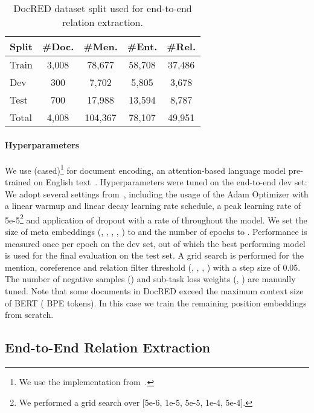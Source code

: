 \documentclass[11pt,a4paper]{article}
\begin{document}
\begin{table}
\centering
\begin{tabular}{l c c c c }
\toprule
    \textbf{Split} & {\#Doc.} & {\#Men.} & {\#Ent.} & {\#Rel.} \\ \midrule
     Train & 3,008 & 78,677 & 58,708 & 37,486 \\
     Dev & 300 & 7,702 & 5,805 & 3,678 \\
     Test & 700 & 17,988 & 13,594 & 8,787 \\
     Total & 4,008 & 104,367 & 78,107 & 49,951 \\
     \bottomrule
\end{tabular}
\caption{DocRED dataset split used for end-to-end relation extraction.} 
\label{table:joint_split} 
\end{table}

\paragraph{Hyperparameters} We use  (cased)\footnote{We use the implementation from~\cite{wolf:2019:hugging_face}.} for document encoding, an attention-based language model pre-trained on English text~\cite{devlin:2018:bert}. Hyperparameters were tuned on the end-to-end dev set: We adopt several settings from~\cite{devlin:2018:bert}, including the usage of the Adam Optimizer with a linear warmup and linear decay learning rate schedule, a peak learning rate of 5e-5\footnote{We performed a grid search over [5e-6, 1e-5, 5e-5, 1e-4, 5e-4].} and application of dropout with a rate of  throughout the model. We set the size of meta embeddings (, , , , ) to  and the number of epochs to . Performance is measured once per epoch on the dev set, out of which the best performing model is used for the final evaluation on the test set. A grid search is performed for the mention, coreference and relation filter threshold (, , , ) with a step size of 0.05. The number of negative samples () and sub-task loss weights (, ) are manually tuned. Note that some documents in DocRED exceed the maximum context size of BERT ( BPE tokens). In this case we train the remaining position embeddings from scratch.


\subsection{End-to-End Relation Extraction}
\end{document}
